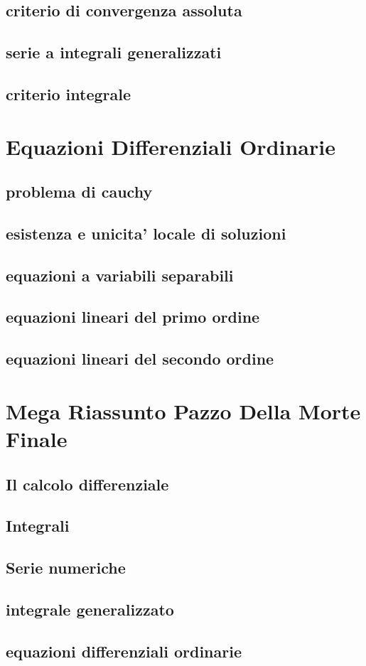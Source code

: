 \documentclass{article}
\theoremstyle{mystyle}
\begin{document}
\subsection{criterio di convergenza assoluta}
\subsection{serie a integrali generalizzati}
\subsection{criterio integrale}
\section{Equazioni Differenziali Ordinarie}
\subsection{problema di cauchy}
\subsection{esistenza e unicita' locale di soluzioni}
\subsection{equazioni a variabili separabili}
\subsection{equazioni lineari del primo ordine}
\subsection{equazioni lineari del secondo ordine}
\section{Mega Riassunto Pazzo Della Morte Finale}
\subsection{Il calcolo differenziale}
\subsection{Integrali}
\subsection{Serie numeriche}
\subsection{integrale generalizzato}
\subsection{equazioni differenziali ordinarie}
\end{document}
